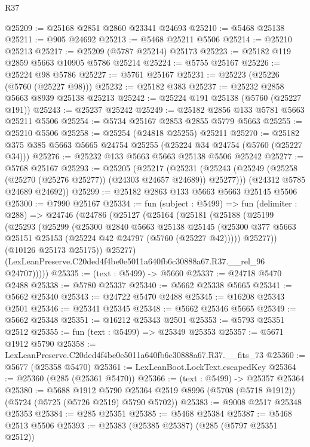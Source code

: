 \begin{lexlean}{R37}
\begin{coremodule}
@25209 := @25168 @2851 @2860 @23341 @24693
@25210 := @5468 @25138
@25211 := @905 @24692
@25213 := @5468 @25211 @5506
@25214 := @25210 @25213
@25217 := @25209 (@5787 @25214) @25173
@25223 := @25182 @119 @2859 @5663 @10905 @5786 @25214
@25224 := @5755 @25167
@25226 := @25224 @98 @5786
@25227 := @5761 @25167
@25231 := @25223 (@25226 (@5760 (@25227 @98)))
@25232 := @25182 @383
@25237 := @25232 @2858 @5663 @8939 @25138 @25213
@25242 := @25224 @191 @25138 (@5760 (@25227 @191))
@25243 := @25237 @25242
@25249 := @25182 @2856 @133 @5781 @5663 @25211 @5506
@25254 := @5734 @25167 @2853 @2855 @5779 @5663
@25255 := @25210 @5506
@25258 := @25254 (@24818 @25255) @25211
@25270 := @25182 @375 @385 @5663 @5665 @24754 @25255 (@25224 @34 @24754 (@5760 (@25227 @34)))
@25276 := @25232 @133 @5663 @5663 @25138 @5506 @25242
@25277 := @5768 @25167
@25293 := @25205
    (@25217
      (@25231 (@25243 (@25249 (@25258 (@25270 (@25276 @25277)) (@24303 @24657 @24689)) @25277)))
      (@24312 @5785 @24689 @24692))
@25299 := @25182 @2863 @133 @5663 @5663 @25145 @5506
@25300 := @7990 @25167
@25334 := fun (subject : @5499) =>
  fun (delimiter : @288) =>
  @24746
    (@24786
      (@25127
        (@25164
          (@25181
            (@25188
              (@25199
                (@25293
                  (@25299
                    (@25300
                      @2840
                      @5663
                      @25138
                      @25145
                      (@25300 @377 @5663 @25151 @25153 (@25224 @42 @24797 (@5760 (@25227 @42)))))
                    @25277))
                (@10126 @25173 @25175))
              @25277)
            (LexLeanPreserve.C20ded4f4be0e5011a640fb6c30888a67.R37.__rel_96 @24707)))))
@25335 := (text : @5499) -> @5660
@25337 := @24718 @5470 @2488
@25338 := @5780 @25337
@25340 := @5662 @25338 @5665
@25341 := @5662 @25340
@25343 := @24722 @5470 @2488
@25345 := @16208 @25343 @2501
@25346 := @25341 @25345
@25348 := @5662 @25346 @5665
@25349 := @5662 @25348
@25351 := @16212 @25343 @2501
@25353 := @5793 @25351 @2512
@25355 := fun (text : @5499) => @25349 @25353
@25357 := @5671 @1912 @5790
@25358 := LexLeanPreserve.C20ded4f4be0e5011a640fb6c30888a67.R37.__fits_73
@25360 := @5677 (@25358 @5470)
@25361 := LexLeanBoot.LockText.escapedKey
@25364 := @25360 (@285 (@25361 @5470))
@25366 := (text : @5499) -> @25357 @25364
@25380 := @5688
    @1912
    @5790
    @25364
    @2519
    @8996
    (@5708 (@5718 @1912))
    (@5724 (@5725 (@5726 @2519) @5790 @5702))
@25383 := @9008 @2517 @25348 @25353
@25384 := @285 @25351
@25385 := @5468 @25384
@25387 := @5468 @2513 @5506
@25393 := @25383 (@25385 @25387) (@285 (@5797 @25351 @2512))

\end{coremodule}
\end{lexlean}
